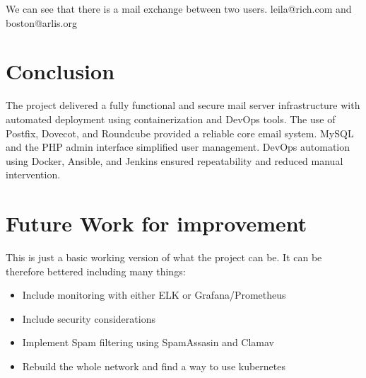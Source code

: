 \documentclass[12pt]{article}
\begin{document}
We can see that there is a mail exchange between two users. leila@rich.com and boston@arlis.org

\section{Conclusion}
The project delivered a fully functional and secure mail server infrastructure with automated deployment using containerization and DevOps tools. The use of Postfix, Dovecot, and Roundcube provided a reliable core email system. MySQL and the PHP admin interface simplified user management. DevOps automation using Docker, Ansible, and Jenkins ensured repeatability and reduced manual intervention.
\section{Future Work for improvement}
This is just a basic working version of what the project can be. It can be therefore bettered including many things:
\begin{itemize}
    \item Include monitoring with either ELK or Grafana/Prometheus
    \item Include security considerations
    \item Implement Spam filtering using SpamAssasin and Clamav
    \item Rebuild the whole network and find a way to use kubernetes
\end{itemize}


\end{document}
